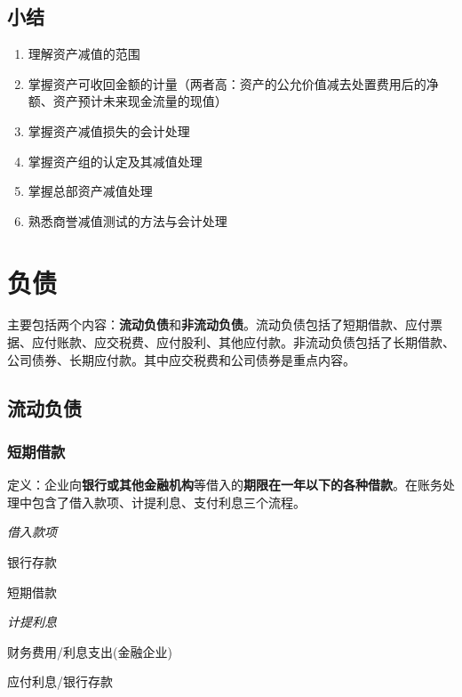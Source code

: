\documentclass[UTF8,12pt]{ctexart}
\newenvironment{Dr}{%
	\begin{list}{}%
		{
			\setlength{\leftmargin}{2em}
			\setlength{\labelwidth}{2em}
			\setlength{\labelsep}{0pt}
			\setlength{\itemindent}{0pt}
			\setlength{\listparindent}{0pt}
			\setlength{\parsep}{0pt}
			\setlength{\topsep}{0pt}
		}
		\item[\textbf{借：}]
	}{%
	\end{list}
}
\newenvironment{Cr}{%
	\begin{list}{}%
		{
			\setlength{\leftmargin}{2em}
			\setlength{\labelwidth}{2em}
			\setlength{\labelsep}{0pt}
			\setlength{\itemindent}{0pt}
			\setlength{\listparindent}{0pt}
			\setlength{\parsep}{0pt}
			\setlength{\topsep}{0pt}
		}
		\item[\textbf{贷：}]
	}{%
	\end{list}
}
\numberwithin{equation}{section} %
\numberwithin{figure}{section}
\numberwithin{table}{section}
\begin{document}
	\subsection{小结}
	\begin{enumerate}
		\item 理解资产减值的范围
		
		\item 掌握资产可收回金额的计量（两者高：资产的公允价值减去处置费用后的净额、资产预计未来现金流量的现值）
		
		\item 掌握资产减值损失的会计处理
		
		\item 掌握资产组的认定及其减值处理
		
		\item 掌握总部资产减值处理
		
		\item 熟悉商誉减值测试的方法与会计处理 
	\end{enumerate}
	
	\newpage
	\section{负债}
	主要包括两个内容：\textbf{流动负债}和\textbf{非流动负债}。流动负债包括了短期借款、应付票据、应付账款、应交税费、应付股利、其他应付款。非流动负债包括了长期借款、公司债券、长期应付款。其中应交税费和公司债券是重点内容。
	
	\subsection{流动负债}
	
	\subsubsection{短期借款}
	定义：企业向\textbf{银行或其他金融机构}等借入的\textbf{期限在一年以下的各种借款}。在账务处理中包含了借入款项、计提利息、支付利息三个流程。
	
	\textit{借入款项}
	
	\begin{Dr}
		银行存款
	\end{Dr}
	\begin{Cr}
		短期借款
	\end{Cr}

	
	\textit{计提利息}
	
	\begin{Dr}
		财务费用/利息支出(金融企业)
	\end{Dr}
	\begin{Cr}
		应付利息/银行存款
	\end{Cr}
\end{document}
